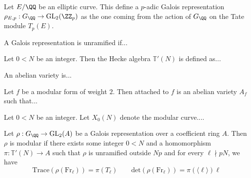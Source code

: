 \begin{definition}\label{defn:ell_curve_gal_rep}
	Let $E/\QQ$ be an elliptic curve. This define a $p$-adic Galois representation $\rho_{E,p} : G_\QQ \to \mathrm{GL}_2(\ZZ_p)$ as the one coming from the action of $G_{\QQ}$ on the Tate module $T_p(E)$.
\end{definition}

\begin{definition}\label{defn:unram_gal_rep}
	A Galois representation is unramified if...
\end{definition}

\begin{definition}\label{defn:hecke_alg}
	Let $0<N$ be an integer. Then the  Hecke algebra $\mathbb{T}'(N)$ is defined as...
\end{definition}

\begin{definition}\label{defn:ab_var}
	An abelian variety is...
\end{definition}

\begin{definition}\label{defn:ab_var_mod_form}
	Let $f$ be a modular form of weight $2$. Then attached to $f$ is an abelian variety $A_f$ such that... 
\end{definition}

\begin{definition}\label{defn:mod_curve_0}
	Let $0 < N$ be an integer. Let $X_0(N)$ denote the modular curve....
\end{definition}

\begin{definition}\label{defn:mod_gal_rep}
	Let $\rho: G_{\QQ} \to \mathrm{GL}_2(A)$ be a Galois representation over a coefficient ring $A$. Then $\rho$ is modular if there exists some integer $0 < N$ and a homomorphism $\pi: \mathbb{T}'(N) \to A$ such that $\rho$ is unramified outside $Np$ and for every $\ell \nmid pN$, we have $$\mathrm{Trace}(\rho (\mathrm{Fr}_\ell) )= \pi(T_\ell) \qquad
	\mathrm{det}(\rho (\mathrm{Fr}_\ell) )= \pi(\langle \ell \rangle) \ell$$ 
\end{definition}

